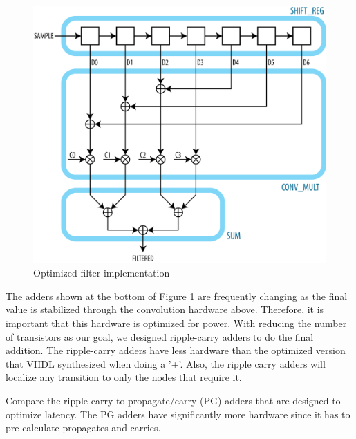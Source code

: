 \begin{figure}[ht]
\centering
\includegraphics[width=5in]{images/filter_filtered}
\caption{Optimized filter implementation}
\label{fig:optimizedfilter}
\end{figure}

The adders shown at the bottom of Figure \ref{fig:optimizedfilter} are frequently changing as the final value is stabilized through the convolution hardware above.  Therefore, it is important that this hardware is optimized for power.  With reducing the number of transistors as our goal, we designed ripple-carry adders to do the final addition.  The ripple-carry adders have less hardware than the optimized version that VHDL synthesized when doing a '+'.  Also, the ripple carry adders will localize any transition to only the nodes that require it.

Compare the ripple carry to propagate/carry (PG) adders that are designed to optimize latency.  The PG adders have significantly more hardware since it has to pre-calculate propagates and carries.  



